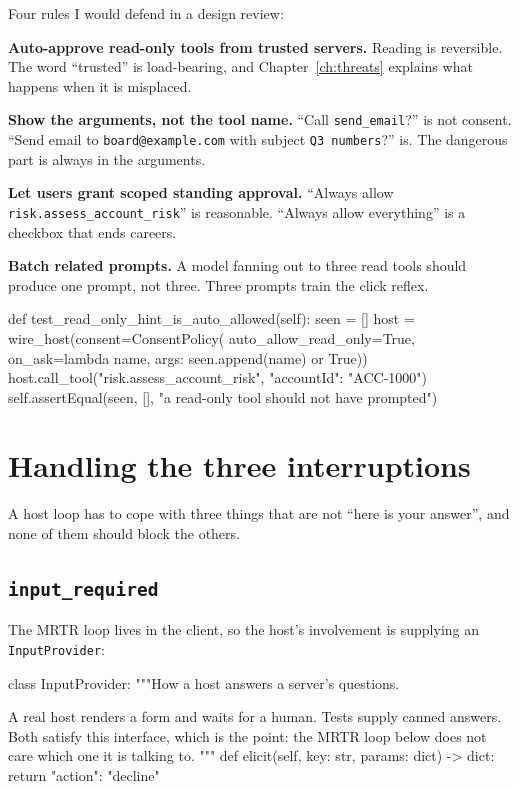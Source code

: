 Four rules I would defend in a design review:

\textbf{Auto-approve read-only tools from trusted servers.} Reading is
reversible. The word ``trusted'' is load-bearing, and Chapter~\ref{ch:threats}
explains what happens when it is misplaced.

\textbf{Show the arguments, not the tool name.} ``Call \texttt{send\_email}?'' is
not consent. ``Send email to \texttt{board@example.com} with subject
\texttt{Q3 numbers}?'' is. The dangerous part is always in the arguments.

\textbf{Let users grant scoped standing approval.} ``Always allow
\texttt{risk.assess\_account\_risk}'' is reasonable. ``Always allow everything''
is a checkbox that ends careers.

\textbf{Batch related prompts.} A model fanning out to three read tools should
produce one prompt, not three. Three prompts train the click reflex.

\begin{py}
def test_read_only_hint_is_auto_allowed(self):
    seen = []
    host = wire_host(consent=ConsentPolicy(
        auto_allow_read_only=True,
        on_ask=lambda name, args: seen.append(name) or True))
    host.call_tool("risk.assess_account_risk", {"accountId": "ACC-1000"})
    self.assertEqual(seen, [], "a read-only tool should not have prompted")
\end{py}

\section{Handling the three interruptions}

A host loop has to cope with three things that are not ``here is your answer'',
and none of them should block the others.

\subsection{\texttt{input\_required}}

The MRTR loop lives in the client, so the host's involvement is supplying an
\texttt{InputProvider}:

\begin{py}
class InputProvider:
    """How a host answers a server's questions.

    A real host renders a form and waits for a human. Tests supply canned
    answers. Both satisfy this interface, which is the point: the MRTR loop
    below does not care which one it is talking to.
    """
    def elicit(self, key: str, params: dict) -> dict:
        return {"action": "decline"}
\end{py}


